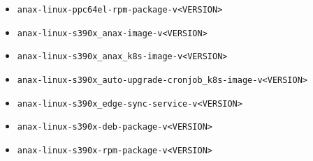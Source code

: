 \documentclass[a4paper,11pt]{article}
\begin{document}
\begin{itemize}
\begin{itemize}
        \item\verb|anax-linux-ppc64el-rpm-package-v<VERSION>|
        \\
        \item\verb|anax-linux-s390x_anax-image-v<VERSION>|
        \item\verb|anax-linux-s390x_anax_k8s-image-v<VERSION>|
        \item\verb|anax-linux-s390x_auto-upgrade-cronjob_k8s-image-v<VERSION>|
        \item\verb|anax-linux-s390x_edge-sync-service-v<VERSION>|
        \item\verb|anax-linux-s390x-deb-package-v<VERSION>|
        \item\verb|anax-linux-s390x-rpm-package-v<VERSION>|
    \end{itemize}
\end{itemize}
\end{document}
